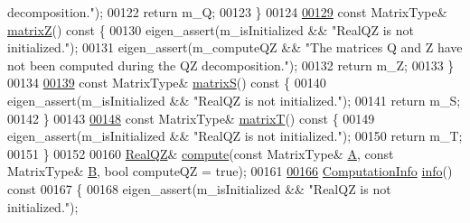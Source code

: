 \begin{DoxyCode}
{       decomposition."});
00122         \textcolor{keywordflow}{return} m\_Q;
00123       \}
00124 
\hyperlink{group___eigenvalues___module_a19a116383f11423179b4d8f316da6f67}{00129}       \textcolor{keyword}{const} MatrixType& \hyperlink{group___eigenvalues___module_a19a116383f11423179b4d8f316da6f67}{matrixZ}()\textcolor{keyword}{ const }\{
00130         eigen\_assert(m\_isInitialized && \textcolor{stringliteral}{"RealQZ is not initialized."});
00131         eigen\_assert(m\_computeQZ && \textcolor{stringliteral}{"The matrices Q and Z have not been computed during the QZ
       decomposition."});
00132         \textcolor{keywordflow}{return} m\_Z;
00133       \}
00134 
\hyperlink{group___eigenvalues___module_ad24d7bf534afb55adaef00f00846adaf}{00139}       \textcolor{keyword}{const} MatrixType& \hyperlink{group___eigenvalues___module_ad24d7bf534afb55adaef00f00846adaf}{matrixS}()\textcolor{keyword}{ const }\{
00140         eigen\_assert(m\_isInitialized && \textcolor{stringliteral}{"RealQZ is not initialized."});
00141         \textcolor{keywordflow}{return} m\_S;
00142       \}
00143 
\hyperlink{group___eigenvalues___module_a8dc963d8ea2a17df9d8d718e9e34d06f}{00148}       \textcolor{keyword}{const} MatrixType& \hyperlink{group___eigenvalues___module_a8dc963d8ea2a17df9d8d718e9e34d06f}{matrixT}()\textcolor{keyword}{ const }\{
00149         eigen\_assert(m\_isInitialized && \textcolor{stringliteral}{"RealQZ is not initialized."});
00150         \textcolor{keywordflow}{return} m\_T;
00151       \}
00152 
00160       \hyperlink{group___eigenvalues___module_class_eigen_1_1_real_q_z}{RealQZ}& \hyperlink{group___eigenvalues___module_a2b6847964d9f1903193cc3e67c196849}{compute}(\textcolor{keyword}{const} MatrixType& \hyperlink{group___core___module_class_eigen_1_1_matrix}{A}, \textcolor{keyword}{const} MatrixType& \hyperlink{group___core___module_class_eigen_1_1_matrix}{B}, \textcolor{keywordtype}{bool} computeQZ = \textcolor{keyword}{true});
00161 
\hyperlink{group___eigenvalues___module_a36bd77afed89f3f5c110a715e69e4c64}{00166}       \hyperlink{group__enums_ga85fad7b87587764e5cf6b513a9e0ee5e}{ComputationInfo} \hyperlink{group___eigenvalues___module_a36bd77afed89f3f5c110a715e69e4c64}{info}()\textcolor{keyword}{ const}
00167 \textcolor{keyword}{      }\{
00168         eigen\_assert(m\_isInitialized && \textcolor{stringliteral}{"RealQZ is not initialized."});

\end{DoxyCode}
